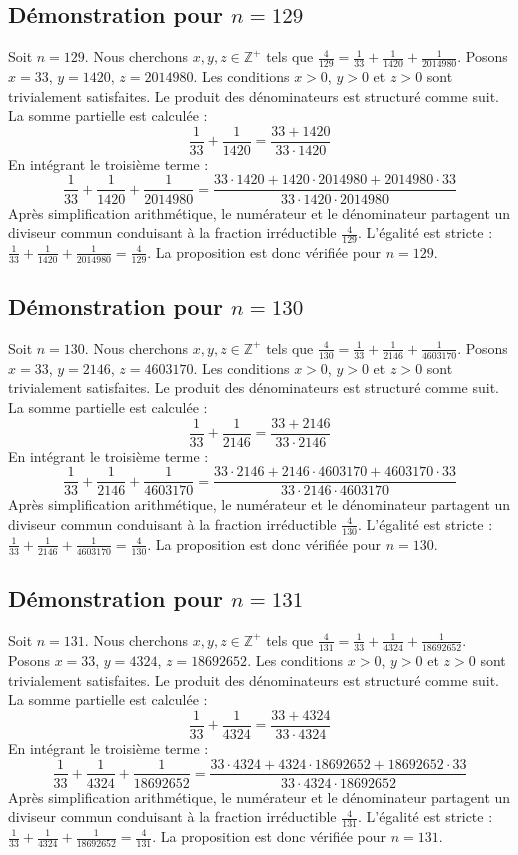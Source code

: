 \documentclass[11pt,a4paper]{article}
\begin{document}
\subsection{Démonstration pour $n = 129$}
Soit $n = 129$. Nous cherchons $x, y, z \in \mathbb{Z}^{+}$ tels que $\frac{4}{129} = \frac{1}{33} + \frac{1}{1420} + \frac{1}{2014980}$.
Posons $x = 33$, $y = 1420$, $z = 2014980$.
Les conditions $x > 0$, $y > 0$ et $z > 0$ sont trivialement satisfaites.
Le produit des dénominateurs est structuré comme suit. La somme partielle est calculée :
$$ \frac{1}{33} + \frac{1}{1420} = \frac{33+1420}{33 \cdot 1420} $$
En intégrant le troisième terme :
$$ \frac{1}{33} + \frac{1}{1420} + \frac{1}{2014980} = \frac{33 \cdot 1420 + 1420 \cdot 2014980 + 2014980 \cdot 33}{33 \cdot 1420 \cdot 2014980} $$
Après simplification arithmétique, le numérateur et le dénominateur partagent un diviseur commun conduisant à la fraction irréductible $\frac{4}{129}$.
L'égalité est stricte : $\frac{1}{33} + \frac{1}{1420} + \frac{1}{2014980} = \frac{4}{129}$.
La proposition est donc vérifiée pour $n = 129$.
\subsection{Démonstration pour $n = 130$}
Soit $n = 130$. Nous cherchons $x, y, z \in \mathbb{Z}^{+}$ tels que $\frac{4}{130} = \frac{1}{33} + \frac{1}{2146} + \frac{1}{4603170}$.
Posons $x = 33$, $y = 2146$, $z = 4603170$.
Les conditions $x > 0$, $y > 0$ et $z > 0$ sont trivialement satisfaites.
Le produit des dénominateurs est structuré comme suit. La somme partielle est calculée :
$$ \frac{1}{33} + \frac{1}{2146} = \frac{33+2146}{33 \cdot 2146} $$
En intégrant le troisième terme :
$$ \frac{1}{33} + \frac{1}{2146} + \frac{1}{4603170} = \frac{33 \cdot 2146 + 2146 \cdot 4603170 + 4603170 \cdot 33}{33 \cdot 2146 \cdot 4603170} $$
Après simplification arithmétique, le numérateur et le dénominateur partagent un diviseur commun conduisant à la fraction irréductible $\frac{4}{130}$.
L'égalité est stricte : $\frac{1}{33} + \frac{1}{2146} + \frac{1}{4603170} = \frac{4}{130}$.
La proposition est donc vérifiée pour $n = 130$.
\subsection{Démonstration pour $n = 131$}
Soit $n = 131$. Nous cherchons $x, y, z \in \mathbb{Z}^{+}$ tels que $\frac{4}{131} = \frac{1}{33} + \frac{1}{4324} + \frac{1}{18692652}$.
Posons $x = 33$, $y = 4324$, $z = 18692652$.
Les conditions $x > 0$, $y > 0$ et $z > 0$ sont trivialement satisfaites.
Le produit des dénominateurs est structuré comme suit. La somme partielle est calculée :
$$ \frac{1}{33} + \frac{1}{4324} = \frac{33+4324}{33 \cdot 4324} $$
En intégrant le troisième terme :
$$ \frac{1}{33} + \frac{1}{4324} + \frac{1}{18692652} = \frac{33 \cdot 4324 + 4324 \cdot 18692652 + 18692652 \cdot 33}{33 \cdot 4324 \cdot 18692652} $$
Après simplification arithmétique, le numérateur et le dénominateur partagent un diviseur commun conduisant à la fraction irréductible $\frac{4}{131}$.
L'égalité est stricte : $\frac{1}{33} + \frac{1}{4324} + \frac{1}{18692652} = \frac{4}{131}$.
La proposition est donc vérifiée pour $n = 131$.
\end{document}
